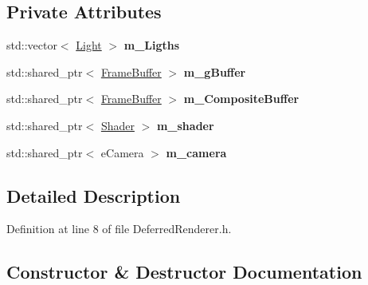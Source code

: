 \subsection*{Private Attributes}
\begin{DoxyCompactItemize}
\item 
std\+::vector$<$ \hyperlink{class_light}{Light} $>$ {\bfseries m\+\_\+\+Ligths}\hypertarget{class_deferred_renderer_a83ca815c8e8a8200bec7b36bb7236b72}{}\label{class_deferred_renderer_a83ca815c8e8a8200bec7b36bb7236b72}

\item 
std\+::shared\+\_\+ptr$<$ \hyperlink{class_frame_buffer}{Frame\+Buffer} $>$ {\bfseries m\+\_\+g\+Buffer}\hypertarget{class_deferred_renderer_a8c4cd8dfb136396766a5b84ddb182995}{}\label{class_deferred_renderer_a8c4cd8dfb136396766a5b84ddb182995}

\item 
std\+::shared\+\_\+ptr$<$ \hyperlink{class_frame_buffer}{Frame\+Buffer} $>$ {\bfseries m\+\_\+\+Composite\+Buffer}\hypertarget{class_deferred_renderer_a3045f0f36f06e7fd7915d4fc68907b5a}{}\label{class_deferred_renderer_a3045f0f36f06e7fd7915d4fc68907b5a}

\item 
std\+::shared\+\_\+ptr$<$ \hyperlink{class_shader}{Shader} $>$ {\bfseries m\+\_\+shader}\hypertarget{class_deferred_renderer_a867cac63d1b0a35b934f874442a0ec95}{}\label{class_deferred_renderer_a867cac63d1b0a35b934f874442a0ec95}

\item 
std\+::shared\+\_\+ptr$<$ e\+Camera $>$ {\bfseries m\+\_\+camera}\hypertarget{class_deferred_renderer_a6b87cec004bc40aebd34c4a25a036ea1}{}\label{class_deferred_renderer_a6b87cec004bc40aebd34c4a25a036ea1}

\end{DoxyCompactItemize}


\subsection{Detailed Description}


Definition at line 8 of file Deferred\+Renderer.\+h.



\subsection{Constructor \& Destructor Documentation}
